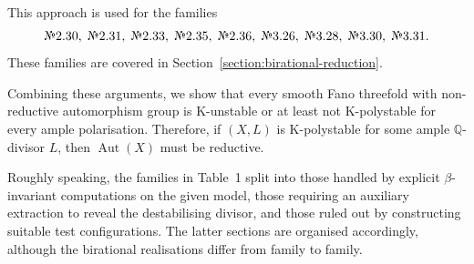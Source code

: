 \documentclass[12pt]{amsart}
\theoremstyle{definition}
\theoremstyle{remark}
\begin{document}
This approach is used for the families
\[
\text{\textnumero } 2.30,\;
\text{\textnumero } 2.31,\;
\text{\textnumero } 2.33,\;
\text{\textnumero } 2.35,\;
\text{\textnumero } 2.36,\;
\text{\textnumero } 3.26,\;
\text{\textnumero } 3.28,\;
\text{\textnumero } 3.30,\;
\text{\textnumero } 3.31.
\]
These families are covered in Section~\ref{section:birational-reduction}.

\medskip

Combining these arguments, we show that every smooth Fano threefold with non-reductive automorphism group is K-unstable or at least not K-polystable for every ample polarisation. Therefore, if $(X,L)$ is K-polystable for some ample $\mathbb{Q}$-divisor $L$, then $\operatorname{Aut}(X)$ must be reductive.

\medskip

Roughly speaking, the families in Table~1 split into those handled by explicit $\beta$-invariant computations on the given model, those requiring an auxiliary extraction to reveal the destabilising divisor, and those ruled out by constructing suitable test configurations. The latter sections are organised accordingly, although the birational realisations differ from family to family.
\end{document}
